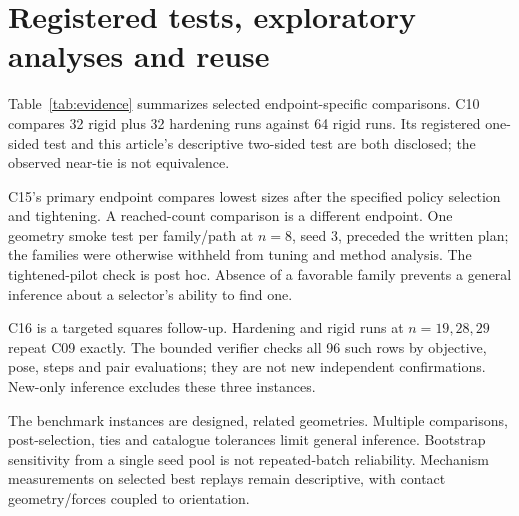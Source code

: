 \documentclass[11pt]{article}
\begin{document}
\section{Registered tests, exploratory analyses and reuse}
\begin{table}[ht]\centering\small\caption{Selected endpoint-specific comparisons; counts are discordant instances.}\label{tab:evidence}\end{table}\FloatBarrier
Table~\ref{tab:evidence} summarizes selected endpoint-specific comparisons. C10 compares 32 rigid plus 32 hardening runs against 64 rigid runs. Its registered one-sided test and this article's descriptive two-sided test are both disclosed; the observed near-tie is not equivalence.

C15's primary endpoint compares lowest sizes after the specified policy selection and tightening. A reached-count comparison is a different endpoint. One geometry smoke test per family/path at $n=8$, seed 3, preceded the written plan; the families were otherwise withheld from tuning and method analysis. The tightened-pilot check is post hoc. Absence of a favorable family prevents a general inference about a selector's ability to find one.

C16 is a targeted squares follow-up. Hardening and rigid runs at $n=19,28,29$ repeat C09 exactly. The bounded verifier checks all 96 such rows by objective, pose, steps and pair evaluations; they are not new independent confirmations. New-only inference excludes these three instances.

The benchmark instances are designed, related geometries. Multiple comparisons, post-selection, ties and catalogue tolerances limit general inference. Bootstrap sensitivity from a single seed pool is not repeated-batch reliability. Mechanism measurements on selected best replays remain descriptive, with contact geometry/forces coupled to orientation.
\end{document}
